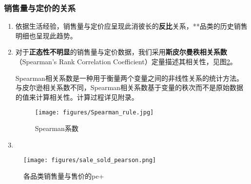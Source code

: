 \documentclass[withoutpreface,bwprint]{cumcmthesis} %
\begin{document}
\subsubsection{销售量与定价的关系}
\begin{enumerate}
    \item 依据生活经验，销售量与定价应呈现此消彼长的\textbf{反比}关系，**品类的历史销售明细也呈现此趋势。

    \item 对于\textbf{正态性不明显}的销售量与定价数据，我们采用\textbf{斯皮尔曼秩相关系数}（Spearman's Rank Correlation Coefficient）定量描述其相关性，见图\ref{fig:sale_sold_pearson}。
    
    Spearman相关系数是一种用于衡量两个变量之间的非线性关系的统计方法。与皮尔逊相关系数不同，Spearman相关系数基于变量的秩次而不是原始数据的值来计算相关性。计算过程详见附录。
    \begin{figure}[!h]
    \centering
    \texttt{[image: figures/Spearman\_rule.jpg]}
    \caption{Spearman系数}
    \label{fig:Spearman_rule}
\end{figure}

    \item 

\end{enumerate}

\begin{figure}[!h]
    \centering
    \texttt{[image: figures/sale\_sold\_pearson.png]}
    \caption{各品类销售量与售价的pe+}
    \label{fig:sale_sold_pearson}
\end{figure}
\end{document}
